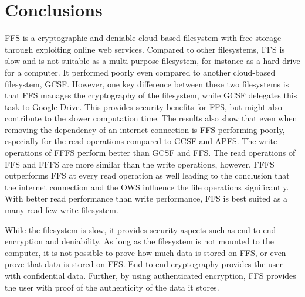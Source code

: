 
\section{Conclusions}
\label{sec:conclusions}
  


\gls{FFS} is a cryptographic and deniable cloud-based filesystem with free storage through exploiting online web services. Compared to other filesystems, \gls{FFS} is slow and is not suitable as a multi-purpose filesystem, for instance as a hard drive for a computer. It performed poorly even compared to another cloud-based filesystem, \gls{GCSF}. However, one key difference between these two filesystems is that \gls{FFS} manages the cryptography of the filesystem, while \gls{GCSF} delegates this task to Google Drive. This provides security benefits for \gls{FFS}, but might also contribute to the slower computation time. The results also show that even when removing the dependency of an internet connection is \gls{FFS} performing poorly, especially for the read operations compared to \gls{GCSF} and \gls{APFS}. The write operations of \gls{FFFS} perform better than \gls{GCSF} and \gls{FFS}. The read operations of \gls{FFS} and \gls{FFFS} are more similar than the write operations, however, \gls{FFFS} outperforms \gls{FFS} at every read operation as well leading to the conclusion that the internet connection and the \gls{OWS} influence the file operations significantly. With better read performance than write performance, \gls{FFS} is best suited as a many-read-few-write filesystem.

While the filesystem is slow, it provides security aspects such as end-to-end encryption and deniability. As long as the filesystem is not mounted to the computer, it is not possible to prove how much data is stored on \gls{FFS}, or even prove that data is stored on \gls{FFS}. End-to-end cryptography provides the user with confidential data. Further, by using authenticated encryption, \gls{FFS} provides the user with proof of the authenticity of the data it stores. 